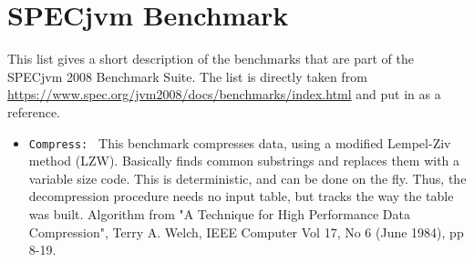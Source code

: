 \section{SPECjvm Benchmark}
\label{a:specjvm_benchmark}
This list gives a short description of the benchmarks that are part of the SPECjvm 2008 Benchmark Suite.
The list is directly taken from \url{https://www.spec.org/jvm2008/docs/benchmarks/index.html} and put in as a reference.
\begin{itemize}
  \item \texttt{Compress: } This benchmark compresses data, using a modified Lempel-Ziv method (LZW). Basically finds common substrings and replaces them with a variable size code. This is deterministic, and can be done on the fly. Thus, the decompression procedure needs no input table, but tracks the way the table was built. Algorithm from "A Technique for High Performance Data Compression", Terry A. Welch, IEEE Computer Vol 17, No 6 (June 1984), pp 8-19.


\end{itemize}
